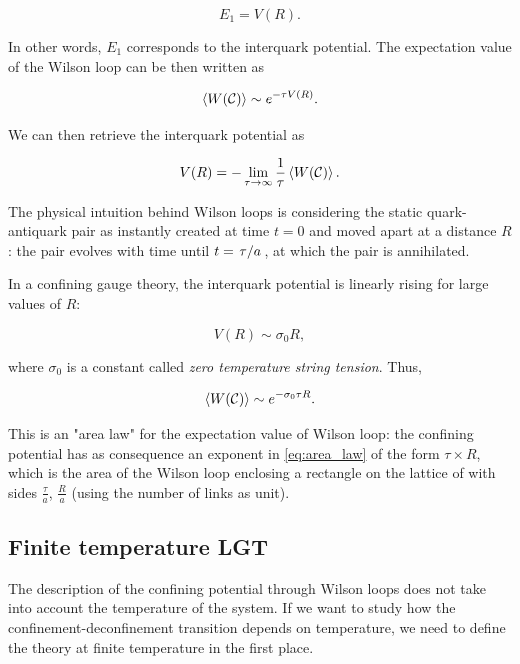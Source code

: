 \documentclass[reqno,12pt]{article}
\numberwithin{equation}{section}
\begin{document}
\begin{equation}
	E_1 = V(R).
\end{equation}

In other words, $E_1$ corresponds to the interquark potential. The expectation value of the Wilson loop
can be then written as

\begin{equation}
	\expval{W(\mathcal{C})} \sim e^{-\tau V(R)}.
\end{equation}

We can then retrieve the interquark potential as

\begin{equation}
	V(R) = - \lim_{\tau \rightarrow \infty} \frac{1}{\tau} \expval{W(\mathcal{C})}.
\end{equation}

The physical intuition behind Wilson loops is considering the static quark-antiquark pair as instantly
created at time $t = 0$ and moved apart at a distance $R$: the pair evolves with time until $t = \flatfrac{\tau}{a}$, at which
the pair is annihilated. 

In a confining gauge theory, the interquark potential is linearly rising for large values of $R$: 

\begin{equation}
	V(R) \sim \sigma_0 R,
\end{equation}

where $\sigma_0$ is a constant called \textit{zero temperature string tension}. Thus,

\begin{equation} \label{eq:area_law}
	\expval{W(\mathcal{C})} \sim e^{-\sigma_0 \tau R}.
\end{equation}

This is an "area law" for the expectation value of Wilson loop: the confining potential has as consequence
an exponent in \eqref{eq:area_law} of the form $\tau \times R$, which is the area of the Wilson loop enclosing
a rectangle on the lattice of with sides $\frac{\tau}{a}$, $\frac{R}{a}$ (using the number of links as unit). 

\subsection{Finite temperature LGT} \label{finitetemperature}

The description of the confining potential through Wilson loops does not take into account the temperature of the system.
If we want to study how the confinement-deconfinement transition depends on temperature, we need to define the theory at finite
temperature in the first place. 
\end{document}
